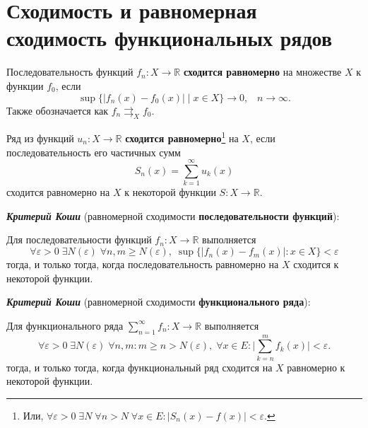 \section*{Сходимость и равномерная сходимость функциональных рядов}

\begin{to_def}
    Последовательность функций $f_n \colon X \to \mathbb{R}$ \textbf{сходится равномерно} на множестве $X$ к функции $f_0$, если
    $$
\sup \{
 |f_n(x) - f_0(x)| \mid x \in X   
\} \to 0, \; \; \; n \to \infty.
    $$ Также обозначается как $f_n \rightrightarrows_X f_0$.
\end{to_def}    

\begin{to_def}
    Ряд из функций $u_n \colon X \to \mathbb{R}$ \textbf{сходится равномерно}\footnote{
        Или, $\forall \varepsilon > 0 \; \exists N  \; \forall n > N \; \forall x \in E \colon |S_n(x) - f(x)| < \varepsilon$.
    } на $X$, если последовательность его частичных сумм
    $$
        S_n(x) = \sum_{k=1}^{\infty} u_k (x)
    $$
    сходится равномерно на $X$ к некоторой функции $S \colon X \to \mathbb{R}$.
\end{to_def}


\noindent
\textbf{\textit{Критерий Коши}} (равномерной сходимости \textbf{последовательности функций}):

Для последовательности функций $f_n \colon X \to \mathbb{R}$ выполняется
$$
\forall \varepsilon > 0 \; \exists N (\varepsilon)  \; \forall n, m \geq N(\varepsilon), \; \sup\{
|f_n(x) - f_m(x)| \colon x \in X
    \} < \varepsilon
$$
тогда, и только тогда, когда последовательность равномерно на $X$ сходится к некоторой функции.


\phantom{42}

\noindent
\textbf{\textit{Критерий Коши}} (равномерной сходимости \textbf{функционального ряда}):

Для функционального ряда $\sum_{n=1}^{\infty} f_n \colon X \to \mathbb{R}$ выполняется
$$
\forall \varepsilon > 0 \; \exists N (\varepsilon)  \; \forall n, m \colon m \geq n > N(\varepsilon), \; \forall x \in E :
 \bigg|\sum_{k=n}^m f_k (x) \bigg| < \varepsilon.
$$
тогда, и только тогда, когда функциональный ряд   сходится на $X$ равномерно к некоторой функции.



